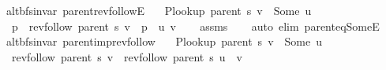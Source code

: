 \begin{isabellebody}
\isamarkupfalse%
%
\endisatagproof
{\isafoldproof}%
%
\isadelimproof
\isanewline
%
\endisadelimproof
\isanewline
{}\isamarkupfalse%
\ {\isacharparenleft}{\kern0pt}\ alt{\isacharunderscore}{\kern0pt}bfs{\isacharunderscore}{\kern0pt}invar{\isacharparenright}{\kern0pt}\ parent{\isacharunderscore}{\kern0pt}rev{\isacharunderscore}{\kern0pt}followE{\isacharcolon}{\kern0pt}\isanewline
\ \ \ {\isachardoublequoteopen}P{\isacharunderscore}{\kern0pt}lookup\ {\isacharparenleft}{\kern0pt}parent\ s{\isacharparenright}{\kern0pt}\ v\ {\isacharequal}{\kern0pt}\ Some\ u{\isachardoublequoteclose}\isanewline
\ \ \ p\ \ {\isachardoublequoteopen}rev{\isacharunderscore}{\kern0pt}follow\ {\isacharparenleft}{\kern0pt}parent\ s{\isacharparenright}{\kern0pt}\ v\ {\isacharequal}{\kern0pt}\ p\ {\isacharat}{\kern0pt}\ {\isacharbrackleft}{\kern0pt}u{\isacharcomma}{\kern0pt}\ v{\isacharbrackright}{\kern0pt}{\isachardoublequoteclose}\isanewline
%
\isadelimproof
\ \ %
\endisadelimproof
%
\isatagproof
{}\isamarkupfalse%
\ assms\isanewline
\ \ \isamarkupfalse%
\ {\isacharparenleft}{\kern0pt}auto\ elim{\isacharcolon}{\kern0pt}\ parent{\isacharunderscore}{\kern0pt}eq{\isacharunderscore}{\kern0pt}SomeE{\isacharparenright}{\kern0pt}%
\endisatagproof
{\isafoldproof}%
%
\isadelimproof
\isanewline
%
\endisadelimproof
\isanewline
{}\isamarkupfalse%
\ {\isacharparenleft}{\kern0pt}\ alt{\isacharunderscore}{\kern0pt}bfs{\isacharunderscore}{\kern0pt}invar{\isacharparenright}{\kern0pt}\ parent{\isacharunderscore}{\kern0pt}imp{\isacharunderscore}{\kern0pt}rev{\isacharunderscore}{\kern0pt}follow{\isacharcolon}{\kern0pt}\isanewline
\ \ \ {\isachardoublequoteopen}P{\isacharunderscore}{\kern0pt}lookup\ {\isacharparenleft}{\kern0pt}parent\ s{\isacharparenright}{\kern0pt}\ v\ {\isacharequal}{\kern0pt}\ Some\ u{\isachardoublequoteclose}\isanewline
\ \ \ {\isachardoublequoteopen}rev{\isacharunderscore}{\kern0pt}follow\ {\isacharparenleft}{\kern0pt}parent\ s{\isacharparenright}{\kern0pt}\ v\ {\isacharequal}{\kern0pt}\ rev{\isacharunderscore}{\kern0pt}follow\ {\isacharparenleft}{\kern0pt}parent\ s{\isacharparenright}{\kern0pt}\ u\ {\isacharat}{\kern0pt}\ {\isacharbrackleft}{\kern0pt}v{\isacharbrackright}{\kern0pt}{\isachardoublequoteclose}\isanewline
%
\isadelimproof
%
\endisadelimproof
%
\isatagproof
{}\isamarkupfalse%
\ {\isacharminus}{\kern0pt}\isanewline
\ \ \isamarkupfalse%

\end{isabellebody}
